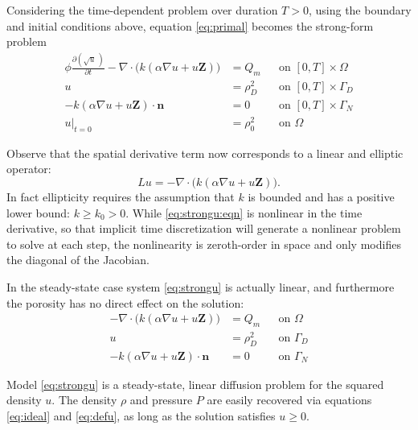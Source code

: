 \documentclass[11pt]{amsart}
\newcommand{\bn}{\mathbf{n}}
\newcommand{\bZ}{\mathbf{Z}}
\newcommand{\Div}{\nabla\cdot}
\newcommand{\grad}{\nabla}
\begin{document}
Considering the time-dependent problem over duration $T>0$, using the boundary and initial conditions above, equation \eqref{eq:primal} becomes the strong-form problem
\begin{subequations}
\label{eq:strongu}
\begin{align}
\phi \frac{\partial(\sqrt{u}\,)}{\partial t} - \Div\Big(k \left(\alpha\grad u + u \bZ\right)\Big) &= Q_m & &\text{on } [0,T]\times \Omega \label{eq:strongu:eqn} \\
u &= \rho_D^2 & &\text{on } [0,T]\times \Gamma_D  \label{eq:strongu:bcD} \\
-k\left(\alpha\grad u + u \bZ\right) \cdot \bn &= 0 & &\text{on } [0,T]\times \Gamma_N  \label{eq:strongu:bcN} \\
u\big|_{t=0} &= \rho_0^2 & &\text{on } \Omega  \label{eq:strongu:initial}
\end{align}
\end{subequations}

Observe that the spatial derivative term now corresponds to a linear and elliptic operator:
\begin{equation}
L u = - \Div\Big(k \left(\alpha\grad u + u \bZ\right)\Big).
\end{equation}
In fact ellipticity requires the assumption that $k$ is bounded and has a positive lower bound: $k \ge k_0 > 0$.  While \eqref{eq:strongu:eqn} is nonlinear in the time derivative, so that implicit time discretization will generate a nonlinear problem to solve at each step, the nonlinearity is zeroth-order in space and only modifies the diagonal of the Jacobian.

In the steady-state case system \eqref{eq:strongu} is actually linear, and furthermore the porosity has no direct effect on the solution:
\begin{subequations}
\label{eq:sstrongu}
\begin{align}
- \Div\Big(k \left(\alpha\grad u + u \bZ\right)\Big) &= Q_m & &\text{on } \Omega \label{eq:sstrongu:eqn} \\
u &= \rho_D^2 & &\text{on } \Gamma_D  \label{eq:sstrongu:bcD} \\
-k\left(\alpha\grad u + u \bZ\right) \cdot \bn &= 0 & &\text{on } \Gamma_N  \label{eq:sstrongu:bcN}
\end{align}
\end{subequations}


Model \eqref{eq:strongu} is a steady-state, linear diffusion problem for the squared density $u$.  The density $\rho$ and pressure $P$ are easily recovered via equations \eqref{eq:ideal} and \eqref{eq:defu}, as long as the solution satisfies $u\ge 0$.
\end{document}
